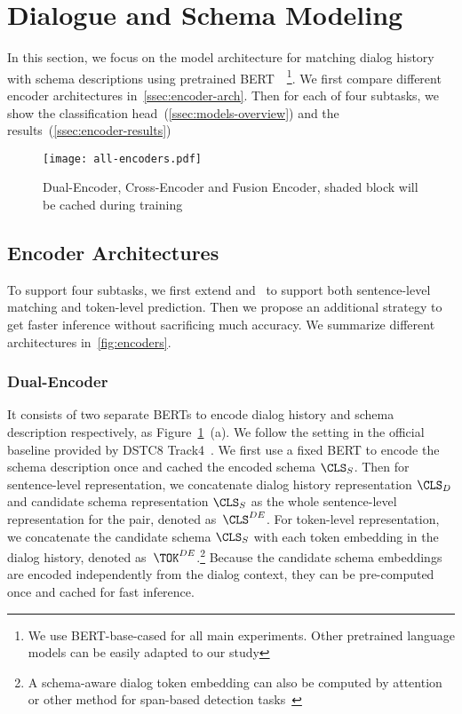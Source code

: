 \section[Dialogue and Schema Modeling]{Dialogue and Schema Modeling}
\label{sec:sgd:models}
In this section, we focus on the model architecture for matching
dialog history with schema descriptions using pretrained
BERT~\cite{devlin2019bert}~\footnote{We use BERT-base-cased for all
  main experiments. Other pretrained language models can be easily
  adapted to our study}. We first compare different encoder
architectures in~\autoref{ssec:encoder-arch}. Then for each of four
subtasks, we show the classification
head~(\autoref{ssec:models-overview}) and the results~(\autoref{ssec:encoder-results})

\begin{figure}[!t]
\centering
  \texttt{[image: all-encoders.pdf]}
  \caption{\label{fig:encoders} Dual-Encoder, Cross-Encoder and Fusion Encoder, shaded block will be cached during training}
\end{figure}

\subsection{Encoder Architectures}
\label{ssec:encoder-arch}
To support four subtasks, we first extend \DE and \CE~to support both
sentence-level matching and token-level prediction. Then we propose an
additional \FE strategy to get faster inference without sacrificing
much accuracy. We summarize different architectures
in~\autoref{fig:encoders}.

\subsubsection{Dual-Encoder}
\label{sssec:sgd:dual-encoder}

It consists of two separate BERTs to encode dialog history and schema
description respectively, as Figure~\ref{fig:encoders}~(a). We follow
the setting in the official baseline provided by DSTC8
Track4~\cite{rastogi2020schema}. We first use a fixed BERT to encode
the schema description once and cached the encoded schema
$\CLS_{S}$. Then for sentence-level representation, we concatenate
dialog history representation $\CLS_{D}$ and candidate schema
representation $\CLS_{S}$ as the whole sentence-level representation
for the pair, denoted as~${\CLS^{DE}}$.  For token-level
representation, we concatenate the candidate schema $\CLS_{S}$ with
each token embedding in the dialog history, denoted
as~${\TOK^{DE}}$.\footnote{A schema-aware dialog token embedding can
  also be computed by attention or other method for span-based
  detection tasks~\cite{humeau2019poly, noroozi2020fast}} Because the
candidate schema embeddings are encoded independently from the dialog
context, they can be pre-computed once and cached for fast inference.

